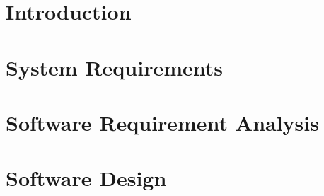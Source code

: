 \documentclass[12pt]{report}
\begin{document}

\begin{screen}
\ppttitle
\end{screen}
\footskip 0.7cm
\thispagestyle{empty} 
\pagetitle
\newpage
{}
\cfoot{\thepage}

%

%

\newpage
\tableofcontents
\newpage

\cfoot{\thepage}
\newpage
\chapter{Introduction}

\newpage
\chapter{System Requirements}

\chapter{Software Requirement Analysis}

\chapter{Software Design}

%
%
%

\end{document}
